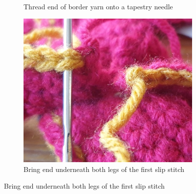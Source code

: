 \documentclass[openany]{book}
\begin{document}
\begin{figure}[H]
\begin{subfigure}[t]{.3\textwidth}
\caption{Thread end of border yarn onto a tapestry needle}
\end{subfigure}
%
\begin{subfigure}[t]{.3\textwidth}
		\centering
		\includegraphics[width=.95\textwidth]{bk/join3}
\caption{Bring end underneath both legs of the first slip stitch}
\end{subfigure}


\end{figure}
\end{document}
